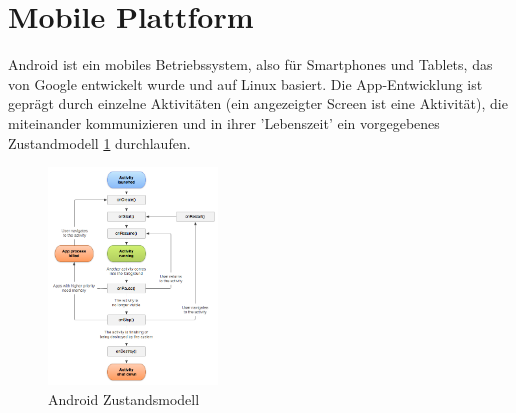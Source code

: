 \section{Mobile Plattform}
\label{sec:grundlagen:plattforml}

Android ist ein mobiles Betriebssystem, also für Smartphones und Tablets, das von Google entwickelt wurde und auf Linux basiert. Die App-Entwicklung ist geprägt durch einzelne Aktivitäten (ein angezeigter Screen ist eine Aktivität), die miteinander kommunizieren und in ihrer 'Lebenszeit' ein vorgegebenes Zustandmodell \ref{figure:androidZustandsmodell} durchlaufen.

\begin{figure}[htp]
	\centering
  	\includegraphics[width=0.4\textwidth]{img/modelle/AndroidZustandsmodell.png}
	\caption{Android Zustandsmodell}
	\label{figure:androidZustandsmodell}
\end{figure}

